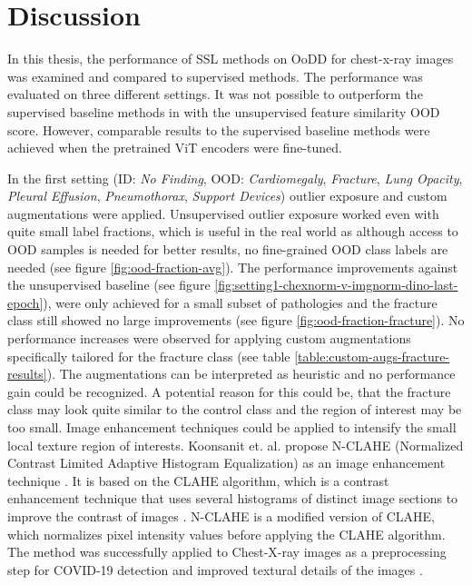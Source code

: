 \section{Discussion}
In this thesis, the performance of SSL methods on OoDD for chest-x-ray images was examined and compared to supervised methods.
The performance was evaluated on three different settings.
It was not possible to outperform the supervised baseline methods in \citep{Berger2021} with the unsupervised feature similarity OOD score.
However, comparable results to the supervised baseline methods were achieved when the pretrained ViT encoders were fine-tuned.
\par
In the first setting (ID: \textit{No Finding}, OOD: \textit{Cardiomegaly}, \textit{Fracture}, \textit{Lung Opacity}, \textit{Pleural Effusion}, \textit{Pneumothorax}, \textit{Support Devices}) outlier exposure and custom augmentations were applied.
Unsupervised outlier exposure worked even with quite small label fractions, which is useful in the real world as although access to OOD samples is needed for better results, no fine-grained OOD class labels are needed (see figure \ref{fig:ood-fraction-avg}).
The performance improvements against the unsupervised baseline (see figure \ref{fig:setting1-chexnorm-v-imgnorm-dino-last-epoch}), were only achieved for a small subset of pathologies and the fracture class still showed no large improvements (see figure \ref{fig:ood-fraction-fracture}).
No performance increases were observed for applying custom augmentations specifically tailored for the fracture class (see table \ref{table:custom-augs-fracture-results}).
The augmentations can be interpreted as heuristic and no performance gain could be recognized.
A potential reason for this could be, that the fracture class may look quite similar to the control class and the region of interest may be too small. 
Image enhancement techniques could be applied to intensify the small local texture region of interests.
Koonsanit et. al. propose N-CLAHE (Normalized Contrast Limited Adaptive Histogram Equalization) as an image enhancement technique \citep{Koonsanit2017}.
It is based on the CLAHE algorithm, which is a contrast enhancement technique that uses several histograms of distinct image sections to improve the contrast of images \citep{Zuiderveld1994}.
N-CLAHE is a modified version of CLAHE, which normalizes pixel intensity values before applying the CLAHE algorithm.
The method was successfully applied to Chest-X-ray images as a preprocessing step for COVID-19 detection and improved textural details of the images \citep{Horry2020}.
